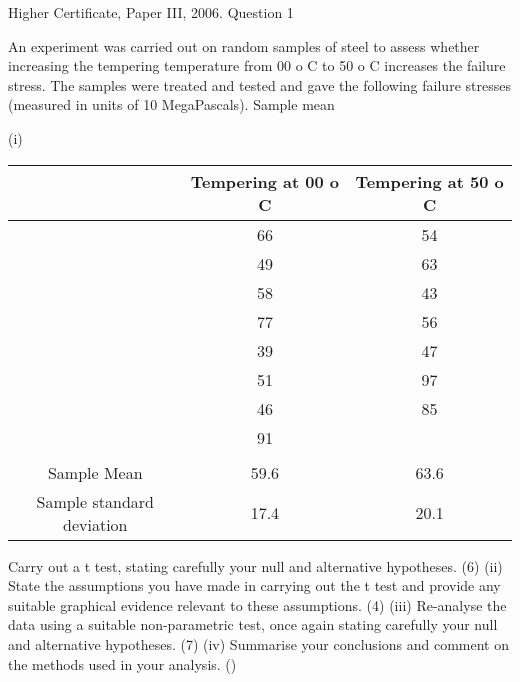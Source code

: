 \documentclass[a4paper,12pt]{article}
\begin{document}
Higher Certificate, Paper III, 2006. Question 1
\begin{framed}

An experiment was carried out on random samples of steel to assess whether
increasing the tempering temperature from 00 o C to 50 o C increases the failure stress.
The samples were treated and tested and gave the following failure stresses (measured
in units of 10 MegaPascals).
Sample mean

(i)

\begin{center}
\begin{tabular}{|ccc|}
	&	Tempering at 00 o C	&	Tempering at 50 o C	\\ \hline 
	&	66	&	54	\\
	&	49	&	63	\\
	&	58	&	43	\\
	&	77	&	56	\\
	&	39	&	47	\\
	&	51	&	97	\\
	&	46	&	85	\\
	&	91	&		\\
	&		&		\\
Sample Mean	&	59.6	&	63.6	\\ \hline 
Sample standard deviation	&	17.4	&	20.1	\\ \hline 
\end{tabular}
\end{center}

Carry out a t test, stating carefully your null and alternative hypotheses.
(6)
(ii) State the assumptions you have made in carrying out the t test and provide any
suitable graphical evidence relevant to these assumptions.
(4)
(iii) Re-analyse the data using a suitable non-parametric test, once again stating
carefully your null and alternative hypotheses.
(7)
(iv) Summarise your conclusions and comment on the methods used in your
analysis.
()
\end{framed}
\end{document}
